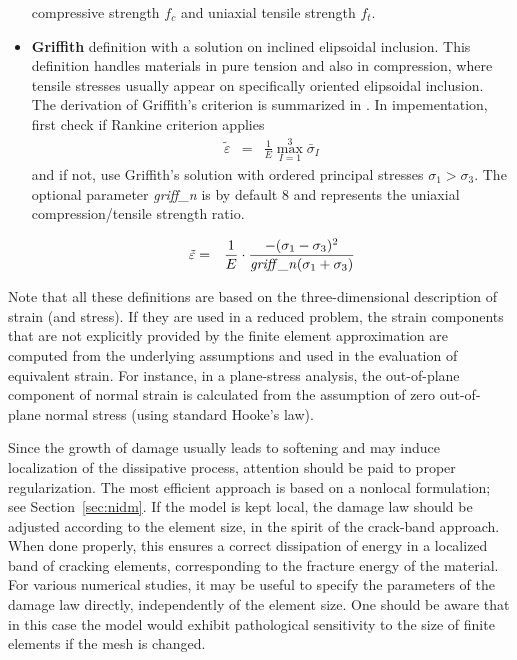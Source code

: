 \documentclass[a4paper]{article}
\newcommand{\param}[1]{{\it #1}}
\newcommand{\del}[2]{\mbox{$\displaystyle\frac{#1}{#2}$}}
\begin{document}
\begin{itemize}
compressive strength $f_c$ and uniaxial tensile strength $f_t$.
\item {\bf Griffith} definition with a solution on inclined elipsoidal inclusion. This definition
handles materials in pure tension and also in compression, where
tensile stresses usually appear on specifically oriented elipsoidal inclusion.
The derivation of Griffith's criterion is summarized in \cite{Hoek}.
In impementation, first check if Rankine criterion applies
\begin{eqnarray}
\label{griffith1}
\tilde\varepsilon&=&{\del{1}{E}}\max_{I=1}^{3}\bar{\sigma}_I
\end{eqnarray}
and if not, use Griffith's solution with ordered principal stresses $\sigma_1>\sigma_3$.
The optional parameter \param{griff\_n} is by default 8 and represents the uniaxial compression/tensile strength ratio.

\begin{eqnarray}
\label{griffith2}
\tilde\varepsilon&=&{\del{1}{E}}\cdot{\del{-(\sigma_1-\sigma_3)^2}{\param{griff\_n}(\sigma_1+\sigma_3)}}
\end{eqnarray}
\end{itemize}

Note that all these definitions are based on the three-dimensional
description of strain (and stress). If they are used in a reduced
problem, the strain components that are not explicitly provided by
the finite element approximation are computed from the underlying 
assumptions and used in the evaluation of equivalent strain.
For instance, in a plane-stress analysis, the out-of-plane component
of normal strain is calculated from the assumption of zero
out-of-plane normal stress (using standard Hooke's law).

Since the growth of damage usually leads to softening and may induce
localization of the dissipative process, attention should be paid
to proper regularization. The most efficient approach is based on
a nonlocal formulation; see Section~\ref{sec:nidm}. 
If the model is kept local, the damage law
should be adjusted according to the element size, in the spirit
of the crack-band approach. When done properly, this ensures
a correct dissipation of energy in a localized band of cracking
elements, corresponding to the fracture energy of the material.
For various numerical studies, it may be useful to specify the
parameters of the damage law directly, independently of the element size.
One should be aware that in this case the model would exhibit
pathological sensitivity to the size of finite elements if the mesh
is changed. 
\end{document}
